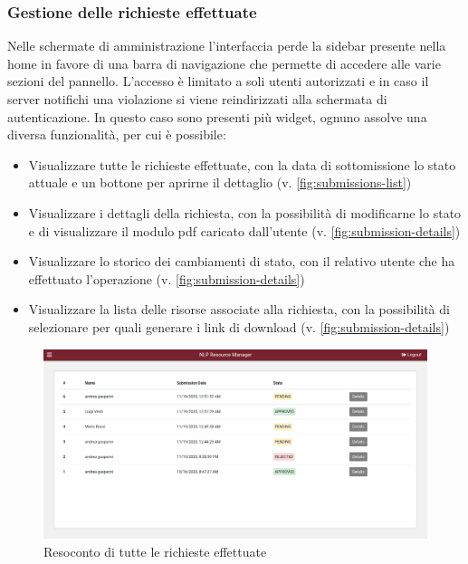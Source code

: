 \subsubsection{Gestione delle richieste effettuate} \label{subsec:submissions-list}
Nelle schermate di amministrazione l'interfaccia perde la sidebar presente nella
home in favore di una barra di navigazione che permette di accedere alle varie
sezioni del pannello. L'accesso è limitato a soli utenti autorizzati e in caso
il server notifichi una violazione si viene reindirizzati alla schermata di
autenticazione. In questo caso sono presenti più widget, ognuno assolve una
diversa funzionalità, per cui è possibile:
\begin{itemize}
	\item Visualizzare tutte le richieste effettuate, con la data di sottomissione
	lo stato attuale e un bottone per aprirne il dettaglio (v. \autoref{fig:submissions-list})
	\item Visualizzare i dettagli della richiesta, con la possibilità di
	modificarne lo stato e di visualizzare il modulo pdf caricato dall'utente (v. \autoref{fig:submission-details})
	\item Visualizzare lo storico dei cambiamenti di stato, con il relativo utente
	che ha effettuato l'operazione (v. \autoref{fig:submission-details})
	\item Visualizzare la lista delle risorse associate alla richiesta, con la
	possibilità di selezionare per quali generare i link di download (v. \autoref{fig:submission-details})
\end{itemize}

\begin{figure}[H]
	\centering
	\includegraphics[width=\textwidth]{assets/ui/submissions-list.png}
	\caption{Resoconto di tutte le richieste effettuate}
	\label{fig:submissions-list}
\end{figure}

